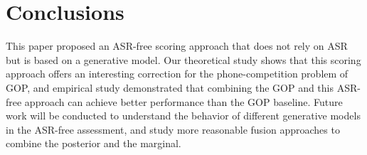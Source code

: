 \documentclass[a4paper]{article}
\begin{document}
\section{Conclusions}
\label{sec:con}

This paper proposed an ASR-free scoring approach that does not rely on ASR but is based on a generative model.
Our theoretical study shows that this scoring approach offers an interesting correction for the phone-competition problem of GOP,
and empirical study demonstrated that combining the GOP and this ASR-free approach can achieve better performance than the GOP baseline.
Future work will be conducted to understand the behavior of different generative models in the ASR-free assessment,
and study more reasonable fusion approaches to combine the posterior and the marginal.


\newpage




\end{document}
